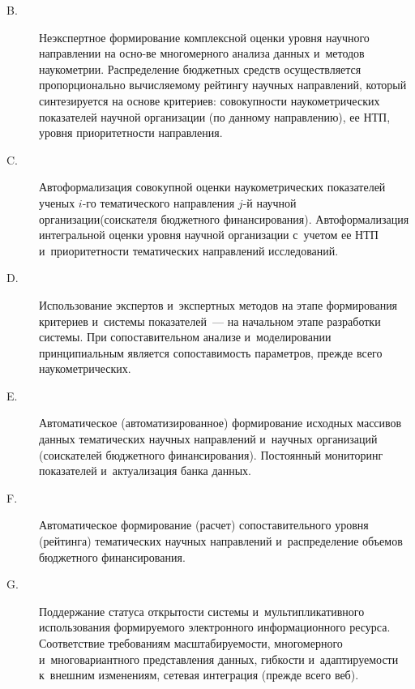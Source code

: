 \begin{multicols}{2}
\begin{description}
 \item[B.] Неэкспертное формирование комплексной оценки уровня 
научного направлении на осно-\linebreak ве многомерного анализа данных и~методов 
наукометрии. Распределение бюджетных средств осуществляется 
пропорционально вы\-чис\-ля\-емо\-му рейтингу научных на\-прав\-ле\-ний, который 
синтезируется на основе критериев: со\-во\-куп\-ности наукометрических 
показателей научной организации (по данному направлению), ее  
НТП, уровня приоритетности 
на\-прав\-ле\-ния.
    
     \item[C.] Автоформализация совокупной оценки наукометрических 
показателей ученых $i$-го темати\-че\-ско\-го направления $j$-й научной 
организации\linebreak (соискателя бюджетного финансирования). Автоформализация 
интегральной оценки уровня научной организации с~учетом ее  
НТП и~приоритетности тематических 
на\-прав\-ле\-ний исследований.
    
    \item[D.] Использование экспертов и~экспертных методов на этапе 
формирования критериев и~сис\-те\-мы показателей~--- на начальном этапе 
разработки сис\-те\-мы. При сопоставительном анализе и~моделировании 
принципиальным является сопоставимость параметров, прежде всего 
наукометрических.
    
     \item[E.] Автоматическое (автоматизированное) формирование 
исходных массивов данных тема\-тических научных на\-прав\-ле\-ний и~научных 
\mbox{организаций} (соискателей бюджетного финансирования). Постоянный 
мониторинг показателей и~актуализация банка данных.
    
    \item[F.] Автоматическое формирование (расчет) сопоставительного 
уровня (рейтинга) тематических научных на\-прав\-ле\-ний и~распределение 
объемов бюджетного финансирования.
    
     \item[G.] Поддержание статуса открытости системы 
и~мультипликативного использования фор\-ми\-ру\-емо\-го электронного 
информационного ресурса. Соответствие требованиям масштабируемости, 
многомерного и~многовариантного представления данных, гиб\-кости 
и~адап\-ти\-ру\-емости к~внешним изменениям, сетевая интеграция (прежде всего 
веб).
\end{description}
    

\end{multicols}
